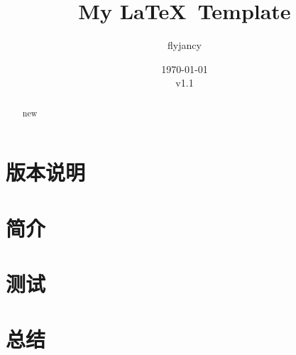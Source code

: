 \documentclass[zh, a4paper, 12pt]{report}
\title {My \LaTeX\ Template}
\author{flyjancy}%
\date{\today\\v1.1}
\begin{document}
\maketitle
\tableofcontents
\setcounter{page}{0}
\thispagestyle{empty}

\section*{版本说明}


\newpage

\begin{abstract}
    \normalsize
    
\end{abstract}

\renewcommand{\abstractname}{Abstract}

\begin{abstract}
new
\end{abstract}

\section{简介}


\section{测试}


\section{总结}



\end{document}
